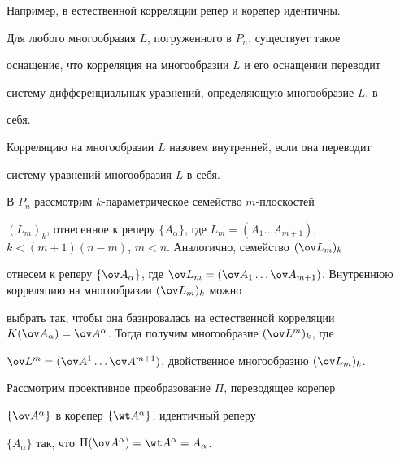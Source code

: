 Например, в естественной корреляции репер и корепер идентичны. 


 


\begin{thm} 


Для любого многообразия $L$, погруженного в $P_n$, существует такое 


оснащение, что корреляция на многообразии $L$ и его оснащении переводит 


систему дифференциальных уравнений, определяющую многообразие $L$, в 


себя. 


\end{thm} 


 


\begin{defn} 


Корреляцию на многообразии $L$ назовем внутренней, если она переводит 


систему уравнений многообразия $L$ в себя. 


\end{defn} 


 


В $P_n$ рассмотрим $k$-параметрическое семейство $m$-плоскостей 


$(L_m)_k$, отнесенное к реперу $\{A_\alpha\}$, где $L_m=(A_1\dotsc 


A_{m+1})$, $k<(m+1)(n-m)$, $m<n$. Аналогично, семейство $(\ov L_m)_k$ 


отнесем к реперу $\{\ov A_\alpha\}$, где $\ov L_m=(\ov A_1\dotsc\ov 


A_{m+1})$. Внутреннюю корреляцию на многообразии $(\ov L_m)_k$ можно 


выбрать так, чтобы она базировалась на естественной корреляции $K(\ov 


A_\alpha)=\ov A^\alpha$. Тогда получим многообразие $(\ov L^m)_k$, где 


$\ov L^m=(\ov A^1\dotsc\ov A^{m+1})$, двойственное многообразию $(\ov 


L_m)_k$. 


 


Рассмотрим проективное преобразование $\Pi$, переводящее корепер 


$\{\ov A^\alpha\}$ в корепер $\{\wt A^\alpha\}$, идентичный реперу 


$\{A_\alpha\}$ так, что $\Pi(\ov A^\alpha)=\wt A^\alpha=A_\alpha$. 


